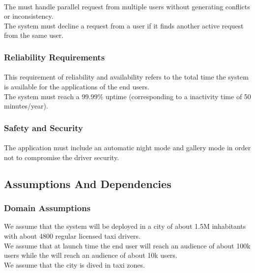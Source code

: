 \paragraph{} 
The \textbf{} must handle parallel request from multiple users without generating conflicts or inconsistency.\\
The system must decline a request from a user if it finds another active request from the same user.

\subsubsection{Reliability Requirements} 
\label{ssub:reliability_requirements}
\paragraph{} 
This requirement of reliability and availability refers to the total time the system is available for the applications of the end users.\\
The system must reach a 99.99\% uptime (corresponding to a inactivity time of 50 minutes/year).
\subsubsection{Safety and Security} 
\label{ssub:safety_and_security}
\paragraph{} 
The application must include an automatic night mode and gallery mode in order not to compromise the driver security.

\subsection{Assumptions And Dependencies} 
\label{sub:assumptions_and_dependencies}
\subsubsection{Domain Assumptions} 
\label{ssub:domain}
We assume that the system will be deployed in a city of about 1.5M inhabitants with about 4800 regular licensed taxi drivers.\\
We assume that at launch time the end user \textbf{} will reach an audience of about 100k users while the \textbf{} will reach an audience of about 10k users.\\
We assume that the city is dived in taxi zones.
